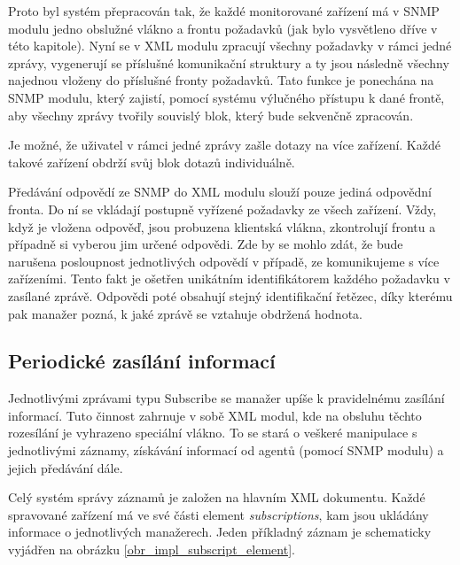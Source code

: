 Proto byl systém přepracován tak, že každé monitorované zařízení má v SNMP modulu jedno obslužné vlákno a frontu požadavků (jak bylo vysvětleno 
dříve v této kapitole). Nyní se v XML modulu zpracují všechny požadavky v rámci jedné zprávy, vygenerují se příslušné komunikační struktury a ty jsou
následně všechny najednou vloženy do příslušné fronty požadavků. Tato funkce je ponechána na SNMP modulu, který zajistí, pomocí systému výlučného přístupu
k dané frontě, aby všechny zprávy tvořily souvislý blok, který bude sekvenčně zpracován.

Je možné, že uživatel v rámci jedné zprávy zašle dotazy na více zařízení. Každé takové zařízení obdrží svůj blok dotazů individuálně.

Předávání odpovědí ze SNMP do XML modulu slouží pouze jediná odpovědní fronta. Do ní se vkládají postupně vyřízené požadavky ze všech zařízení.
Vždy, když je vložena odpověď, jsou probuzena klientská vlákna, zkontrolují frontu a případně si vyberou jim určené odpovědi. Zde by se mohlo zdát,
že bude narušena posloupnost jednotlivých odpovědí v případě, ze komunikujeme s více zařízeními. Tento fakt je ošetřen unikátním identifikátorem každého
požadavku v zasílané zprávě. Odpovědi poté obsahují stejný identifikační řetězec, díky kterému pak manažer pozná, k jaké zprávě se vztahuje obdržená hodnota.

\subsection{Periodické zasílání informací}
Jednotlivými zprávami typu Subscribe se manažer upíše k pravidelnému zasílání informací. Tuto činnost zahrnuje v sobě XML modul, kde na obsluhu těchto
rozesílání je vyhrazeno speciální vlákno. To se stará o veškeré manipulace s jednotlivými záznamy, získávání informací od agentů (pomocí SNMP modulu) a jejich
předávání dále.

Celý systém správy záznamů je založen na hlavním XML dokumentu. Každé spravované zařízení má ve své části element \textit{subscriptions}, kam jsou ukládány
informace o jednotlivých manažerech. Jeden příkladný záznam je schematicky vyjádřen na obrázku \ref{obr_impl_subscript_element}.

